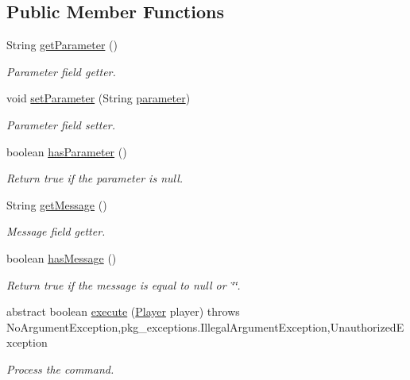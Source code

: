 \subsection*{Public Member Functions}
\begin{DoxyCompactItemize}
\item 
String \hyperlink{classpkg__commands_1_1Command_a41c92d445be73ea9d62320c65efb8434}{get\-Parameter} ()
\begin{DoxyCompactList}\small\item\em Parameter field getter. \end{DoxyCompactList}\item 
void \hyperlink{classpkg__commands_1_1Command_a18446243a5fd360e9341b4b141c0cccc}{set\-Parameter} (String \hyperlink{classpkg__commands_1_1Command_a089fe1b30b43b2ad5f0dcb2f0ffc2fdd}{parameter})
\begin{DoxyCompactList}\small\item\em Parameter field setter. \end{DoxyCompactList}\item 
boolean \hyperlink{classpkg__commands_1_1Command_a02af95ab3f1898a66259ab7c177b6998}{has\-Parameter} ()
\begin{DoxyCompactList}\small\item\em Return true if the parameter is null. \end{DoxyCompactList}\item 
String \hyperlink{classpkg__commands_1_1Command_ac2a42e2bab264821892daefaf9a18b6c}{get\-Message} ()
\begin{DoxyCompactList}\small\item\em Message field getter. \end{DoxyCompactList}\item 
boolean \hyperlink{classpkg__commands_1_1Command_ae46bb048d0fa705a5037a5204b530da2}{has\-Message} ()
\begin{DoxyCompactList}\small\item\em Return true if the message is equal to null or \char`\"{}\char`\"{}. \end{DoxyCompactList}\item 
abstract boolean \hyperlink{classpkg__commands_1_1Command_a19008923c75a87c87d1f3ba8bf8be43f}{execute} (\hyperlink{classpkg__world_1_1Player}{Player} player)  throws No\-Argument\-Exception,pkg\-\_\-exceptions.\-Illegal\-Argument\-Exception,\-Unauthorized\-Exception
\begin{DoxyCompactList}\small\item\em Process the command. \end{DoxyCompactList}\end{DoxyCompactItemize}
